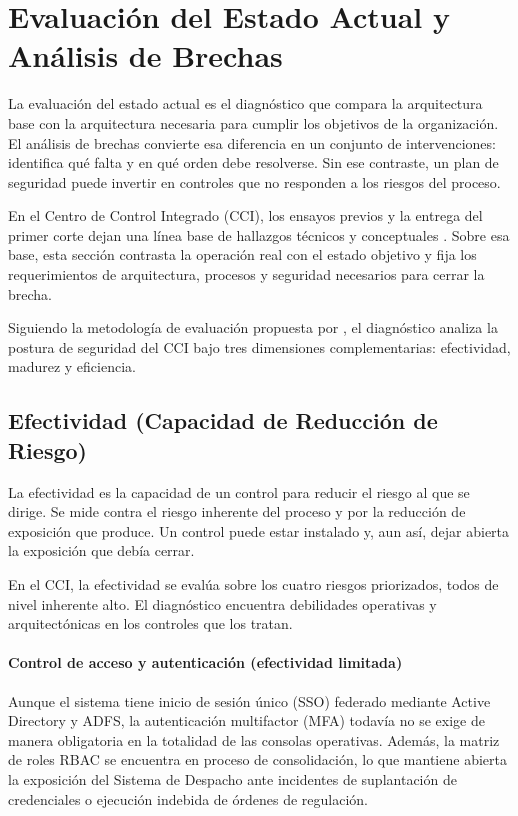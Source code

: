 \section{Evaluación del Estado Actual y Análisis de Brechas}
\label{sec:evaluacion-brechas}

La evaluación del estado actual es el diagnóstico que compara la arquitectura base con la arquitectura necesaria para cumplir los objetivos de la organización. El análisis de brechas convierte esa diferencia en un conjunto de intervenciones: identifica qué falta y en qué orden debe resolverse. Sin ese contraste, un plan de seguridad puede invertir en controles que no responden a los riesgos del proceso.

En el Centro de Control Integrado (CCI), los ensayos previos y la entrega del primer corte dejan una línea base de hallazgos técnicos y conceptuales \parencite{fase1cci2026}. Sobre esa base, esta sección contrasta la operación real con el estado objetivo y fija los requerimientos de arquitectura, procesos y seguridad necesarios para cerrar la brecha.

Siguiendo la metodología de evaluación propuesta por \textcite{moyle2020practical}, el diagnóstico analiza la postura de seguridad del CCI bajo tres dimensiones complementarias: efectividad, madurez y eficiencia.

\subsection{Efectividad (Capacidad de Reducción de Riesgo)}
\label{sec:efectividad}

La efectividad es la capacidad de un control para reducir el riesgo al que se dirige. Se mide contra el riesgo inherente del proceso y por la reducción de exposición que produce. Un control puede estar instalado y, aun así, dejar abierta la exposición que debía cerrar.

En el CCI, la efectividad se evalúa sobre los cuatro riesgos priorizados, todos de nivel inherente alto. El diagnóstico encuentra debilidades operativas y arquitectónicas en los controles que los tratan.

\paragraph{Control de acceso y autenticación (efectividad limitada)}%
Aunque el sistema tiene inicio de sesión único (SSO) federado mediante Active Directory y ADFS, la autenticación multifactor (MFA) todavía no se exige de manera obligatoria en la totalidad de las consolas operativas. Además, la matriz de roles RBAC se encuentra en proceso de consolidación, lo que mantiene abierta la exposición del Sistema de Despacho ante incidentes de suplantación de credenciales o ejecución indebida de órdenes de regulación.

